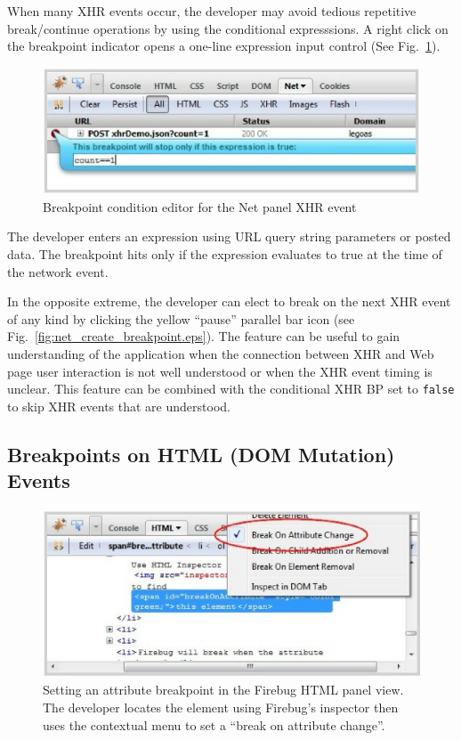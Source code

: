 \documentclass{www2010-accepted}
\begin{document}
When many XHR events
occur, the developer may avoid tedious repetitive break/continue
operations by using the conditional expresssions. A right click on the
breakpoint indicator opens a one-line expression input control (See Fig.~\ref{fig:net_create_condition.eps}).
\begin{figure}[htp]
\center
\includegraphics[scale=0.7]{net_create_condition.eps}
\caption{Breakpoint condition editor for the Net panel XHR event}
\label{fig:net_create_condition.eps}
\end{figure}
The developer
enters an expression using URL
query string parameters or posted data. The breakpoint hits only if the expression
evaluates to true at the time of the network event.

In the opposite extreme, the developer can elect to break on the next
XHR event of any kind by clicking the yellow ``pause'' parallel bar icon
(see Fig.~\ref{fig:net_create_breakpoint.eps}).
The feature can be useful to gain understanding of the
application when the connection between XHR and Web page user
interaction is not well understood or when the XHR event timing is
unclear. This feature can be combined with the conditional XHR BP set
to \texttt{false} to skip XHR events that are understood.

\subsection{Breakpoints on HTML (DOM Mutation) Events}
\begin{figure}[htp]
\center
\includegraphics[scale=0.7]{html_create_breakpoint.eps}
\caption{Setting an attribute breakpoint in the Firebug HTML panel
view. The developer locates the element using Firebug's inspector 
then uses the contextual menu to set a ``break on attribute change''.}
\label{fig:html_create_breakpoint.eps}
\end{figure}
\end{document}

